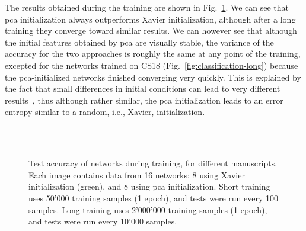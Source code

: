 \documentclass[conference]{IEEEtran}
\begin{document}
The results obtained during the training are shown in Fig.~\ref{fig:pca-vs-xavier}.
We can see that \ac{pca} initialization always outperforms Xavier initialization, although after a long training they converge toward similar results.
We can however see that although the initial features obtained by \ac{pca} are visually stable, the variance of the accuracy for the two approaches is roughly the same at any point of the training, excepted for the networks trained on CS18 (Fig.~\ref{fig:classification-long}) because the \ac{pca}-initialized networks finished converging very quickly.
This is explained by the fact that small differences in initial conditions can lead to very different results~\cite{poincare1899methodes}, thus although rather similar, the \ac{pca} initialization leads to an error entropy similar to a random, i.e., Xavier, initialization.


\begin{figure}[tb]
  \centering
  \hfill
   \\
  \hfill
  \hfill
   \\
  \hfill
  \hfill
  \caption{
    Test accuracy of networks during training, for different manuscripts.
    Each image contains data from 16 networks: 8 using Xavier initialization (green), and 8 using \ac{pca} initialization.
    Short training uses 50'000 training samples (1 epoch), and tests were run every 100 samples.
    Long training uses 2'000'000 training samples (1 epoch), and tests were run every 10'000 samples.
  }
  \label{fig:pca-vs-xavier}
\end{figure}
\end{document}
